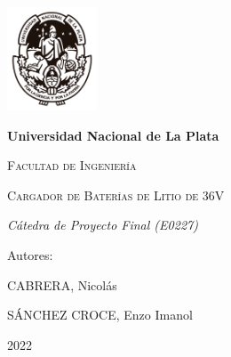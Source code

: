 \documentclass[12pt]{report}
\begin{document}
\begin{titlepage}
    \centering
    {\includegraphics[width=0.2\textwidth]{images/unlp-escudo.png}\par}
    \vspace{1cm}
    {\bfseries\LARGE Universidad Nacional de La Plata \par}
    \vspace{1cm}
    {\scshape\LARGE Facultad de Ingenier\'ia \par}
    \vspace{3cm}
    {\scshape\Huge Cargador de Bater\'ias de Litio de 36V \par}
    \vspace{3cm}
    {\itshape\Large C\'atedra de Proyecto Final (E0227) \par}
    \vfill
    {\Large Autores: \par}
    {\large CABRERA, Nicol\'as \par}
    {\large S\'ANCHEZ CROCE, Enzo Imanol \par}
    \vfill
    {\Large 2022 \par}
\end{titlepage}
\thispagestyle{empty}
\newpage


\tableofcontents
\newpage


\printbibliography
\end{document}
